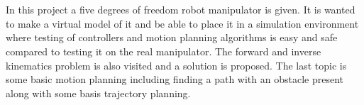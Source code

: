 \chapter*{\englishabstractname}
In this project a five degrees of freedom robot manipulator is given. It is wanted to make a virtual model of it and be able to place it in a simulation environment where testing of controllers and motion planning algorithms is easy and safe compared to testing it on the real manipulator. The forward and inverse kinematics problem is also visited and a solution is proposed. The last topic is some basic motion planning including finding a path with an obstacle present along with some basis trajectory planning. %
\clearpage
